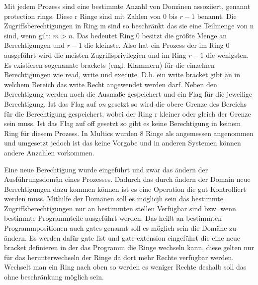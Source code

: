 \documentclass[9pt,technote]{IEEEtran}
\begin{document}
    Mit jedem Prozess sind eine bestimmte Anzahl von Dom\"anen assoziiert, genannt protection rings. Diese r Ringe sind mit Zahlen von $0$ bis $r - 1$ benannt.
    Die Zugriffsberechtigungen in Ring m sind so beschr\"ankt das sie eine Teilmenge von n sind, wenn gilt: $m > n$. Das bedeutet
    Ring $0$ besitzt die gr\"o\ss te Menge an Berechtigungen und $r-1$ die kleinste. Also hat ein Prozess der im Ring $0$ ausgef\"uhrt wird
    die meisten Zugriffsprivilegien und im Ring $r-1$ die wenigsten. Es existieren sogenannte brackets (engl. Klammern) f\"ur die einzelnen Berechtigungen
    wie read, write und execute. D.h. ein write bracket gibt an in welchem Bereich das write Recht angewendet werden darf. Neben den 
    Berechtigung werden noch die Ausma\ss e gespeichert und ein Flag f\"ur die jeweilige Berechtigung. Ist das Flag auf \textit{on} gesetzt 
    so wird die obere Grenze des Bereichs f\"ur die Berechtigung gespeichert, wobei der Ring r kleiner oder gleich der Grenze sein muss.
    Ist das Flag auf off gesetzt so gibt es keine Berechtigung in keinem Ring f\"ur diesem Prozess. In Multics wurden 8 Ringe als angemessen 
    angenommen und umgesetzt jedoch ist das keine Vorgabe und in anderen Systemen k\"onnen andere Anzahlen vorkommen.
    
    Eine neue Berechtigung wurde eingef\"uhrt und zwar das \"andern der Ausf\"uhrungsdom\"an eines Prozesses.
    Dadurch das durch \"andern der Domain neue Berechtigungen dazu kommen k\"onnen ist es eine Operation die gut Kontrolliert werden muss.
    Mithilfe der Dom\"anen soll es m\"oglicjh sein das bestimmte Zugriffsberechtigungen nur an bestimmten stellen Verf\"ugbar  sind bzw. wenn bestimmte Programmteile 
    ausgef\"uhrt werden. Das hei\ss t an bestimmten Programmpositionen auch gates genannt soll es m\"oglich sein die Dom\"ane zu \"andern.
    Es werden daf\"ur gate list und gate extension eingef\"uhrt die eine neue bracket definieren in der das Programm die Ringe wechseln kann, diese
    gelten nur f\"ur das herunterwechseln der Ringe da dort mehr Rechte verf\"ugbar werden. Wechselt man ein Ring nach oben so werden es weniger Rechte deshalb
    soll das ohne beschr\"ankung m\"oglich sein. 
    
    
\end{document}
